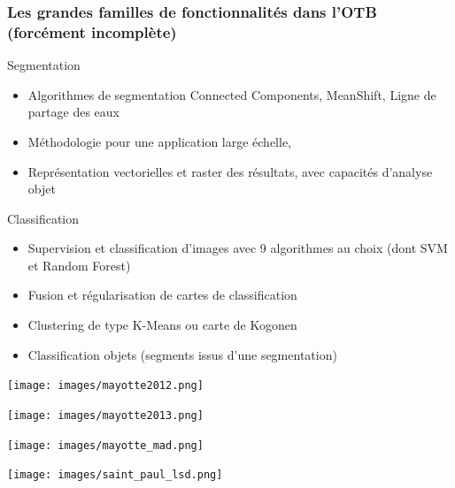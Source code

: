 \documentclass[8pt]{beamer}
\begin{document}
\begin{frame}
\frametitle{Les grandes familles de fonctionnalités dans l'OTB (forcément incomplète)}
\begin{block}{Segmentation}
\begin{itemize}
\item Algorithmes de segmentation Connected Components, MeanShift, Ligne de partage des eaux
\item Méthodologie pour une application large échelle,
\item Représentation vectorielles et raster des résultats, avec capacités d'analyse objet
\end{itemize}
\end{block}

\begin{block}{Classification}
\begin{itemize}
\item Supervision et classification d'images avec 9 algorithmes au choix (dont SVM et Random Forest)
\item Fusion et régularisation de cartes de classification
\item Clustering de type K-Means ou carte de Kogonen
\item Classification objets (segments issus d'une segmentation)
\end{itemize}
\end{block}

\end{frame}

\vspace*{-6.5mm}    
\begin{frame}[plain]
\hspace*{-11mm}
    \texttt{[image: images/mayotte2012.png]}
\end{frame} 

\vspace*{-6.5mm}    
\begin{frame}[plain]
\hspace*{-11mm}
    \texttt{[image: images/mayotte2013.png]}
\end{frame} 

\vspace*{-6.5mm}    
\begin{frame}[plain]
\hspace*{-11mm}
    \texttt{[image: images/mayotte\_mad.png]}
\end{frame} 

\vspace*{-6.5mm}    
\begin{frame}[plain]
\hspace*{-11mm}
\texttt{[image: images/saint\_paul\_lsd.png]}
\end{frame} 
\end{document}
